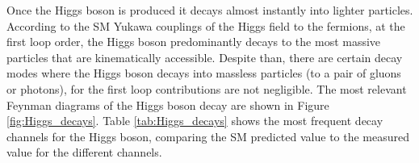 Once the Higgs boson is produced it decays almost instantly into lighter particles. According to the SM Yukawa couplings of the Higgs field to the fermions, at the first loop order, the Higgs boson predominantly decays to the most massive particles that are kinematically accessible. Despite than, there are certain decay modes where the Higgs boson decays into massless particles (to a pair of gluons or photons), for the first loop contributions are not negligible. The most relevant Feynman diagrams of the Higgs boson decay are shown in Figure \ref{fig:Higgs_decays}. Table \ref{tab:Higgs_decays} shows the most frequent decay channels for the Higgs boson, comparing the SM predicted value to the measured value for the different channels.


